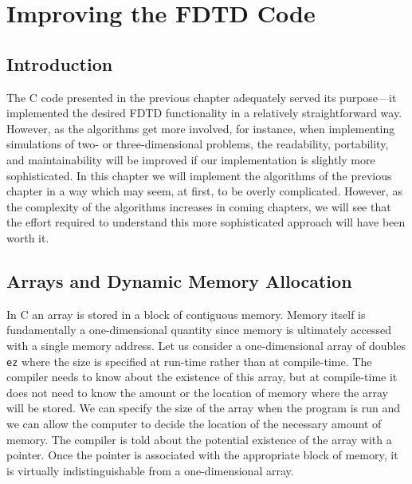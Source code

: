 \chapter{Improving the FDTD Code \label{chap:fdtdImproved}} 


\renewcommand{\thefootnote}{\fnsymbol{footnote}}

\section{Introduction}

The C code presented in the previous chapter adequately served its
purpose---it implemented the desired FDTD functionality in a
relatively straightforward way.  However, as the algorithms get more
involved, for instance, when implementing simulations of two- or
three-dimensional problems, the readability, portability, and
maintainability will be improved if our implementation is slightly
more sophisticated.  In this chapter we will implement the algorithms
of the previous chapter in a way which may seem, at first, to be
overly complicated.  However, as the complexity of the algorithms
increases in coming chapters, we will see that the effort required to
understand this more sophisticated approach will have been worth it.

\section{Arrays and Dynamic Memory
  Allocation \label{sec:memAllocation}} 

In C an array is stored in a block of contiguous memory.  Memory
itself is fundamentally a one-dimensional quantity since memory is
ultimately accessed with a single memory address.  Let us consider a
one-dimensional array of doubles {\tt ez} where the size is specified
at run-time rather than at compile-time.  The compiler needs to know
about the existence of this array, but at compile-time it does not
need to know the amount or the location of memory where the array will
be stored.  We can specify the size of the array when the program is
run and we can allow the computer to decide the location of the
necessary amount of memory.  The compiler is told about the potential
existence of the array with a pointer.  Once the
pointer is associated with the appropriate block of memory, it is
virtually indistinguishable from a one-dimensional array.

